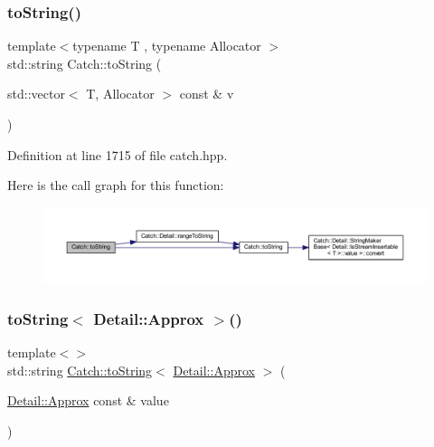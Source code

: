 \hypertarget{namespace_catch_a2899237fef39daaae9a22e7846c0a9bf}{}\label{namespace_catch_a2899237fef39daaae9a22e7846c0a9bf} 
\subsubsection{\texorpdfstring{to\+String()}{toString()}\hspace{0.1cm}{\footnotesize\ttfamily [17/17]}}
{\footnotesize\ttfamily template$<$typename T , typename Allocator $>$ \\
std\+::string Catch\+::to\+String (\begin{DoxyParamCaption}\item[{std\+::vector$<$ T, Allocator $>$ const \&}]{v }\end{DoxyParamCaption})}



Definition at line 1715 of file catch.\+hpp.

Here is the call graph for this function\+:\nopagebreak
\begin{figure}[H]
\begin{center}
\leavevmode
\includegraphics[width=350pt]{namespace_catch_a2899237fef39daaae9a22e7846c0a9bf_cgraph}
\end{center}
\end{figure}
\hypertarget{namespace_catch_ac501c2b6bfe82978d699ddda37c53d13}{}\label{namespace_catch_ac501c2b6bfe82978d699ddda37c53d13} 
\subsubsection{\texorpdfstring{to\+String$<$ Detail\+::\+Approx $>$()}{toString< Detail::Approx >()}}
{\footnotesize\ttfamily template$<$$>$ \\
std\+::string \hyperlink{namespace_catch_adbd1730f961da94d9ed284f70fd7a28b}{Catch\+::to\+String}$<$ \hyperlink{class_catch_1_1_detail_1_1_approx}{Detail\+::\+Approx} $>$ (\begin{DoxyParamCaption}\item[{\hyperlink{class_catch_1_1_detail_1_1_approx}{Detail\+::\+Approx} const \&}]{value }\end{DoxyParamCaption})\hspace{0.3cm}{\ttfamily [inline]}}



